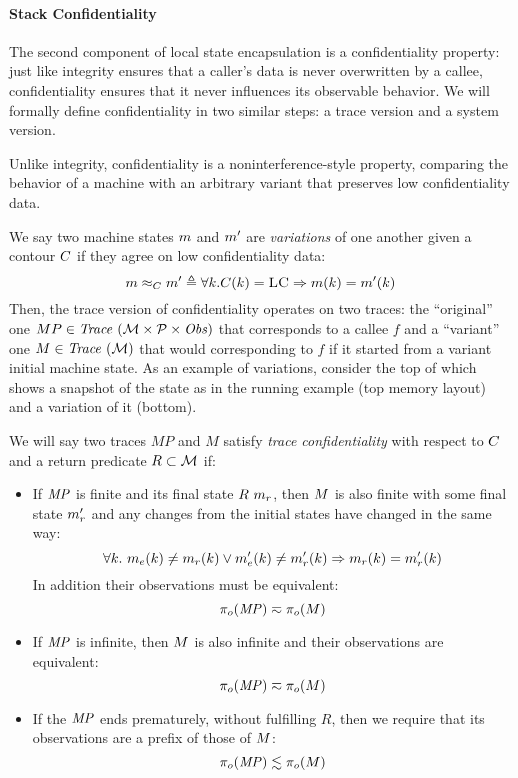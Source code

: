 \documentclass[acmsmall,review,anonymous]{acmart}\settopmatter{printfolios=true,printccs=false,printacmref=false}
\begin{document}
\paragraph*{Stack Confidentiality}

The second component of local state encapsulation is a confidentiality
property: just like integrity ensures that a caller's data is never
overwritten by a callee, confidentiality ensures that it never
influences its observable behavior. We will formally define
confidentiality in two similar steps: a trace version and a system
version.

Unlike integrity, confidentiality is a noninterference-style property,
comparing the behavior of a machine with an arbitrary variant that
preserves low confidentiality data.

We say two machine states $m$ and $m'$ are {\em variations} of one
another given a contour $C$ if they agree on low
confidentiality data:
%
\[
m \approx_C m' \triangleq \forall k .
C(k) = \textsc{LC} \Rightarrow m(k) =
m'(k)
\]
%
Then, the trace version of confidentiality operates on two traces: the
``original'' one $MP \in \mathit{Trace}~({\mathcal M} \times \mathcal{P} \times \mathit{Obs})$ that corresponds to a callee $f$
and a ``variant'' one $M \in \mathit{Trace}~({\mathcal M})$ that would corresponding to $f$
if it started from a variant initial machine state.
%
As an example of variations, consider the top of 
which shows a snapshot of the state as in the running example (top
memory layout) and a variation of it (bottom). 

 We will say two traces $MP$ and $M$
satisfy {\em trace confidentiality} with respect to $C$ and
a return predicate \(R \subset {\mathcal M}\) if:
\begin{itemize}
\item If $\mathit{MP}$ is finite and its final state $R\ m_r$,
  then $M$ is also finite with some final state $m_r'$ and
  any changes from the initial states have changed in the same way:
$$\forall k. ~ m_e(k) \not = m_r(k)
  \vee m_e'(k) \not = m_r'(k) \Rightarrow
  m_r(k) = m_r'(k)$$
  In addition their observations must be equivalent:
  $$\pi_o(\mathit{MP}) \eqsim \pi_o(M)$$
\item If $\mathit{MP}$ is infinite, then $M$ is also infinite and their
  observations are equivalent:
  $$\pi_o(\mathit{MP}) \eqsim \pi_o(M)$$
\item If the $\mathit{MP}$ ends prematurely, without fulfilling \(R\), then
  we require that its observations are a prefix of those of $M$:
  $$\pi_o(\mathit{MP}) \lesssim \pi_o(M)$$
\end{itemize}
\end{document}
